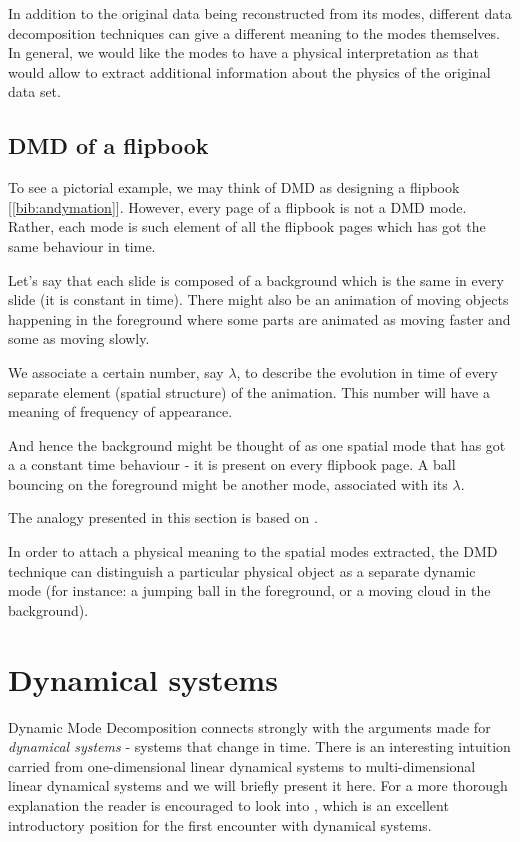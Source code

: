 \documentclass[10pt,twocolumn]{article}
\begin{document}
In addition to the original data being reconstructed from its modes, different data decomposition techniques can give a different meaning to the modes themselves. In general, we would like the modes to have a physical interpretation as that would allow to extract additional information about the physics of the original data set.


\subsection{DMD of a flipbook}

To see a pictorial example, we may think of DMD as designing a flipbook [\ref{bib:andymation}]. However, every page of a flipbook is not a DMD mode. Rather, each mode is such element of all the flipbook pages which has got the same behaviour in time.

Let's say that each slide is composed of a background which is the same in every slide (it is constant in time). There might also be an animation of moving objects happening in the foreground where some parts are animated as moving faster and some as moving slowly.

We associate a certain number, say $\lambda$, to describe the evolution in time of every separate element (spatial structure) of the animation. This number will have a meaning of frequency of appearance.

And hence the background might be thought of as one spatial mode that has got a a constant time behaviour - it is present on every flipbook page. A ball bouncing on the foreground might be another mode, associated with its $\lambda$. 

The analogy presented in this section is based on \cite{Grosek}.

In order to attach a physical meaning to the spatial modes extracted, the DMD technique can distinguish a particular physical object as a separate dynamic mode (for instance: a jumping ball in the foreground, or a moving cloud in the background).


\section{Dynamical systems}

Dynamic Mode Decomposition connects strongly with the arguments made for \textit{dynamical systems} - systems that change in time. There is an interesting intuition carried from one-dimensional linear dynamical systems to multi-dimensional linear dynamical systems and we will briefly present it here. For a more thorough explanation the reader is encouraged to look into \cite{Prof_Edward_Scheinerman}, which is an excellent introductory position for the first encounter with dynamical systems.
\end{document}
